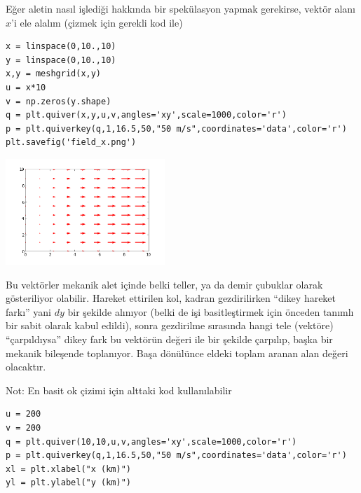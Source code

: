 \documentclass[12pt,fleqn]{article}\usepackage{../../common}
\begin{document}
Eğer aletin nasıl işlediği hakkında bir spekülasyon yapmak gerekirse,
vektör alanı $x$'i ele alalım (çizmek için gerekli kod ile)

\begin{verbatim}
x = linspace(0,10.,10)
y = linspace(0,10.,10)
x,y = meshgrid(x,y)
u = x*10
v = np.zeros(y.shape)
q = plt.quiver(x,y,u,v,angles='xy',scale=1000,color='r')
p = plt.quiverkey(q,1,16.5,50,"50 m/s",coordinates='data',color='r')
plt.savefig('field_x.png')
\end{verbatim}

\includegraphics[height=4cm]{field_x.png}

Bu vektörler mekanik alet içinde belki teller, ya da demir çubuklar olarak
gösteriliyor olabilir. Hareket ettirilen kol, kadran gezdirilirken ``dikey
hareket farkı'' yani $dy$ bir şekilde alınıyor (belki de işi basitleştirmek
için önceden tanımlı bir sabit olarak kabul edildi), sonra gezdirilme
sırasında hangi tele (vektöre) ``çarpıldıysa'' dikey fark bu vektörün
değeri ile bir şekilde çarpılıp, başka bir mekanik bileşende
toplanıyor. Başa dönülünce eldeki toplam aranan alan değeri olacaktır.

Not: En basit ok çizimi için alttaki kod kullanılabilir

\begin{verbatim}
u = 200
v = 200
q = plt.quiver(10,10,u,v,angles='xy',scale=1000,color='r')
p = plt.quiverkey(q,1,16.5,50,"50 m/s",coordinates='data',color='r')
xl = plt.xlabel("x (km)")
yl = plt.ylabel("y (km)")
\end{verbatim}
\end{document}
